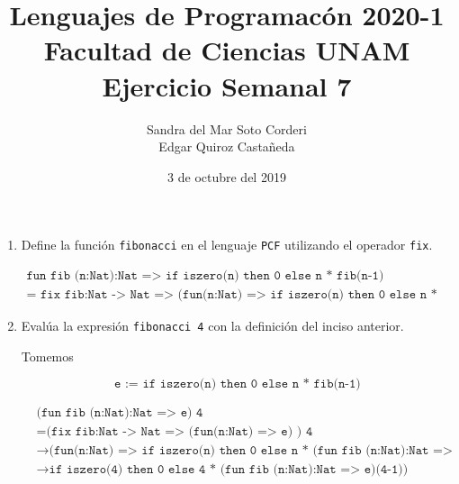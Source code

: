 \documentclass{article}
\title{
    Lenguajes de Programacón 2020-1\\
    Facultad de Ciencias UNAM\\
    Ejercicio Semanal 7
}
\author{
    Sandra del Mar Soto Corderi\\
    Edgar Quiroz Castañeda
}
\date{
    3 de octubre del 2019
}
\begin{document}
    \maketitle

    \begin{enumerate}
        \item {
            Define la función \texttt{fibonacci} en el lenguaje \texttt{PCF}
            utilizando el operador \texttt{fix}.

            \begin{align*}
                \texttt{
                    fun fib (n:Nat):Nat 
                    => if iszero(n) then 0 else n * fib(n-1)
                }\\
                \texttt{
                    = fix fib:Nat -> Nat
                    => (fun(n:Nat) => if iszero(n) then 0 else n * fib(n-1))
                }
            \end{align*}
                
        }
        \item {
            Evalúa la expresión \texttt{fibonacci 4} con la definición del
            inciso anterior.

            Tomemos

            \[
                \texttt{e := if iszero(n) then 0 else n * fib(n-1)}
            \]

            \begin{align*}
                &\texttt{
                    (fun fib (n:Nat):Nat => e) 4
                } \\
                &=\texttt{
                    (fix fib:Nat -> Nat
                    => (fun(n:Nat) => e)
                    ) 4
                } \\
                &\rightarrow 
                \texttt{
                    (fun(n:Nat) => if iszero(n) then 0 
                    else n * (fun fib (n:Nat):Nat => e)(n-1)) 4
                } \\
                &\rightarrow
                \texttt{
                    if iszero(4) then 0 
                    else 4 * (fun fib (n:Nat):Nat => e)(4-1))
                }
            \end{align*}
        }
    \end{enumerate}
\end{document}

